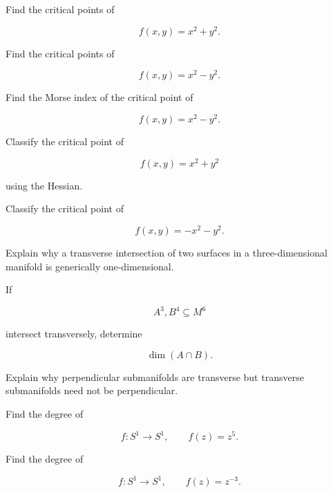 \begin{exercise}[2]
Find the critical points of

\[
f(x,y)=x^2+y^2.
\]
\end{exercise}

\begin{exercise}[2]
Find the critical points of

\[
f(x,y)=x^2-y^2.
\]
\end{exercise}

\begin{exercise}[2]
Find the Morse index of the critical point of

\[
f(x,y)=x^2-y^2.
\]
\end{exercise}

\begin{exercise}[2]
Classify the critical point of

\[
f(x,y)=x^2+y^2
\]

using the Hessian.
\end{exercise}

\begin{exercise}[2]
Classify the critical point of

\[
f(x,y)=-x^2-y^2.
\]
\end{exercise}

\begin{exercise}[2]
Explain why a transverse intersection of two surfaces in a
three-dimensional manifold is generically one-dimensional.
\end{exercise}

\begin{exercise}[2]
If

\[
A^3,B^4\subseteq M^6
\]

intersect transversely, determine

\[
\dim(A\cap B).
\]
\end{exercise}

\begin{exercise}[2]
Explain why perpendicular submanifolds are transverse but transverse
submanifolds need not be perpendicular.
\end{exercise}

\begin{exercise}[2]
Find the degree of

\[
f:S^1\to S^1,
\qquad
f(z)=z^5.
\]
\end{exercise}

\begin{exercise}[2]
Find the degree of

\[
f:S^1\to S^1,
\qquad
f(z)=z^{-3}.
\]
\end{exercise}

